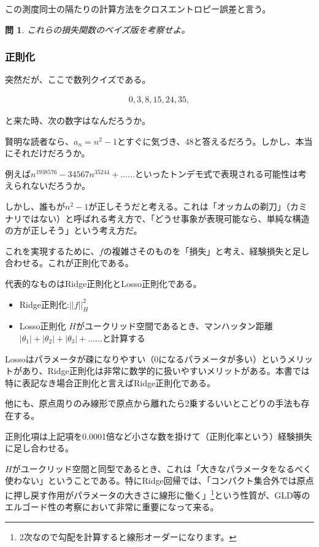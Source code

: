 \documentclass{jsarticle}
\newtheorem{pro}{問}[section]
\begin{document}
この測度同士の隔たりの計算方法をクロスエントロピー誤差と言う。

\begin{pro}
これらの損失関数のベイズ版を考察せよ。
\end{pro}


\subsubsection{正則化}

突然だが、ここで数列クイズである。

\begin{align}
0,3,8,15,24,35,
\end{align}

と来た時、次の数字はなんだろうか。

賢明な読者なら、$a_n=n^2-1$とすぐに気づき、48と答えるだろう。しかし、本当にそれだけだろうか。

例えば$n^1938576-34567n^35244+......$といったトンデモ式で表現される可能性は考えられないだろうか。

しかし、誰もが$n^2-1$が正しそうだと考える。これは「オッカムの剃刀」（カミナリではない）と呼ばれる考え方で、「どうせ事象が表現可能なら、単純な構造の方が正しそう」という考え方だ。

これを実現するために、$f$の複雑さそのものを「損失」と考え、経験損失と足し合わせる。これが正則化である。

代表的なものはRidge正則化とLosso正則化である。

\begin{itemize} 
\item Ridge正則化:$||f||^2_H$
\item Losso正則化 $H$がユークリッド空間であるとき、マンハッタン距離$|\theta_1|+|\theta_2|+|\theta_3|+......$と計算する
\end{itemize}

Lossoはパラメータが疎になりやすい（0になるパラメータが多い）というメリットがあり、Ridge正則化は非常に数学的に扱いやすいメリットがある。本書では特に表記なき場合正則化と言えばRidge正則化である。

他にも、原点周りのみ線形で原点から離れたら2乗するいいとこどりの手法も存在する。

正則化項は上記項を0.0001倍など小さな数を掛けて（正則化率という）経験損失に足し合わせる。

$H$がユークリッド空間と同型であるとき、これは「大きなパラメータをなるべく使わない」ということである。特にRidge回帰では、「コンパクト集合外では原点に押し戻す作用がパラメータの大きさに線形に働く」\footnote{2次なので勾配を計算すると線形オーダーになります。}という性質が、GLD等のエルゴード性の考察において非常に重要になって来る。
\end{document}
